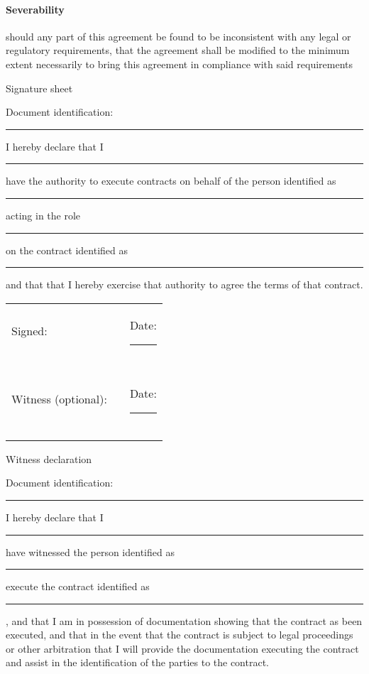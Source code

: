 \documentclass[10pt]{article}
\begin{document}
\paragraph{Severability} should any part of this agreement be found to be inconsistent with any legal or regulatory requirements, that the agreement shall be modified to the minimum extent necessarily to bring this agreement in compliance with said requirements

\pagebreak

\begin{center}
{Signature sheet}
\end{center}

Document identification: \rule{10cm}{.2pt}

\vspace{1cm}

I hereby declare that I \rule{5cm}{.2pt} have the authority to execute
contracts on behalf of the person identified as \rule{5cm}{.2pt}
acting in the role \rule{5cm}{.2pt} on the contract identified as
\rule{5cm}{.2pt} and that that I hereby exercise that authority to
agree the terms of that contract.

\vspace{1cm}

\noindent \begin{tabular}{l l l}
Signed: & \rule{6cm}{.2pt} & Date: \rule{2.4cm}{.2pt}\\
                         &       & \\\\\\

Witness (optional): & \rule{6cm}{.2pt} & Date: \rule{2.4cm}{.2pt}\\ &
& \\\\\\
\end{tabular}

\pagebreak

\begin{center}
{Witness declaration}
\end{center}

Document identification: \rule{10cm}{.2pt}

\vspace{1cm}

I hereby declare that I \rule{5cm}{.2pt} have witnessed the person
identified as \rule{5cm}{.2pt} execute the contract identified as
\rule{5cm}{.2pt}, and that I am in possession of documentation showing
that the contract as been executed, and that in the event that the
contract is subject to legal proceedings or other arbitration that I
will provide the documentation executing the contract and assist in
the identification of the parties to the contract.
\end{document}
